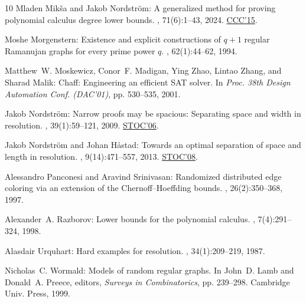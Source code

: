 \begin{thebibliography}{10}
{\sc Mladen Mik\v{s}a and Jakob Nordstr\"om}: A generalized method for proving
  polynomial calculus degree lower bounds.
, 71(6):1--43, 2024.
\newblock \prelim \href{https://doi.org/10.4230/LIPIcs.CCC.2015.467}{CCC'15}.
\newblock [\epfmtdoi{10.1145/3675668}]

{\sc Moshe Morgenstern}: Existence and explicit constructions of $q + 1$
  regular {R}amanujan graphs for every prime power $q$.
, 62(1):44--62, 1994.

{\sc Matthew~W. Moskewicz, Conor~F. Madigan, Ying Zhao, Lintao Zhang, and
  Sharad Malik}: Chaff: {E}ngineering an efficient {SAT} solver.
\newblock In {\em Proc. 38th Design Automation Conf. (DAC'01)}, pp. 530--535,
  2001.
\newblock [\epfmtdoi{10.1145/378239.379017}]

{\sc Jakob Nordstr\"om}: Narrow proofs may be spacious: Separating space and
  width in resolution.
, 39(1):59--121, 2009.
\newblock \prelim \href{https://doi.org/10.1145/1132516.1132590}{STOC'06}.
\newblock [\epfmtdoi{10.1137/060668250}]

{\sc Jakob Nordström and Johan H{\aa}stad}: Towards an optimal separation of
  space and length in resolution.
, 9(14):471--557, 2013.
\newblock \prelim \href{https://doi.org/10.1145/1374376.1374478}{STOC'08}.

{\sc Alessandro Panconesi and Aravind Srinivasan}: Randomized distributed edge
  coloring via an extension of the {C}hernoff--{H}oeffding bounds.
, 26(2):350--368, 1997.
\newblock [\epfmtdoi{10.1137/S0097539793250767}]

{\sc Alexander~A. Razborov}: Lower bounds for the polynomial calculus.
, 7(4):291--324, 1998.
\newblock [\epfmtdoi{10.1007/s000370050013}]

{\sc Alasdair Urquhart}: Hard examples for resolution.
, 34(1):209--219, 1987.
\newblock [\epfmtdoi{10.1145/7531.8928}]

{\sc Nicholas~C. Wormald}: Models of random regular graphs.
\newblock In {\sc John~D. Lamb and Donald~A. Preece}, editors, {\em Surveys in
  Combinatorics}, pp. 239--298. Cambridge Univ. Press, 1999.

\end{thebibliography}